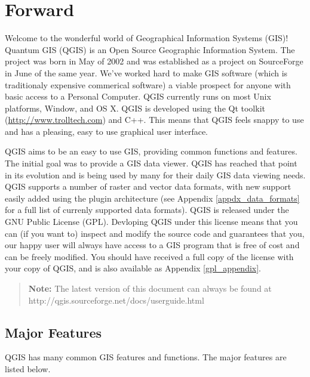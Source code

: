 
\chapter{Forward}

Welcome to the wonderful world of Geographical Information Systems (GIS)!
Quantum GIS (QGIS) is an Open Source Geographic Information System. The project
was born in May of 2002 and was established as a project on SourceForge in June
of the same year. We've worked hard to make GIS software (which is traditionaly
expensive commerical software) a viable prospect for anyone with basic access
to a Personal Computer. QGIS currently runs on most Unix platforms, Window, and
OS X. QGIS is developed using the Qt toolkit (\url{http://www.trolltech.com})
and C++. This means that QGIS feels snappy to use and has a pleasing, easy to
use graphical user interface. 

QGIS aims to be an easy to use GIS, providing common functions and features.
The initial goal was to provide a GIS data viewer. QGIS has reached that point
in its evolution and is being used by many for their daily GIS data viewing
needs. QGIS supports a number of raster and vector data formats, with new
support easily added using the plugin architecture (see Appendix
\ref{appdx_data_formats} for a full list of currenly supported data formats).
QGIS is released under the GNU Public License (GPL). Devloping QGIS under this
license means that you can (if you want to) inspect and modify the source code
and guarantees that you, our happy user will always have access to a GIS
program that is free of cost and can be freely modified. You should have
received a full copy of the license with your copy of QGIS, and is also
available as Appendix \ref{gpl_appendix}.  
\begin{quote}
\begin{center}
\textbf{Note:} The latest version of this document can always be found at \newline
http://qgis.sourceforge.net/docs/userguide.html 
\end{center}
\end{quote}

\section{Major Features}

QGIS has many common GIS features and functions. The major features
are listed below. 

